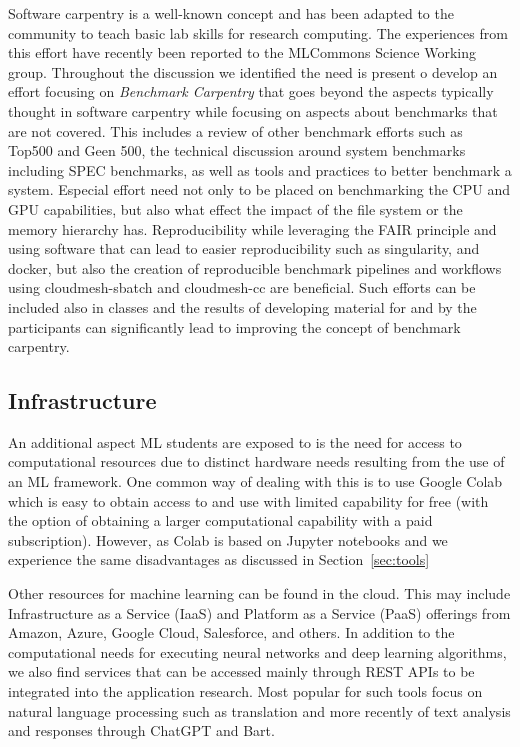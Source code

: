 \documentclass[utf8]{FrontiersinVancouver} %
\begin{document}
{Software carpentry \citep{software-carpentry} is a well-known concept
and has been adapted to the community to teach basic lab skills for
research computing.  The experiences from this effort have recently
been reported to the MLCommons Science Working group. Throughout the
discussion we identified the need is present o develop an effort
focusing on {\em Benchmark Carpentry} that goes beyond the aspects
typically thought in software carpentry while focusing on aspects
about benchmarks that are not covered. This includes a review of other
benchmark efforts such as Top500 and Geen 500, the technical
discussion around system benchmarks including SPEC benchmarks, as well
as tools and practices to better benchmark a system. Especial effort
need not only to be placed on benchmarking the CPU and GPU
capabilities, but also what effect the impact of the file system or
the memory hierarchy has. Reproducibility while leveraging the FAIR
principle and using software that can lead to easier reproducibility
such as singularity, and docker, but also the creation of reproducible
benchmark pipelines and workflows using cloudmesh-sbatch and
cloudmesh-cc are beneficial. Such efforts can be included also in
classes and the results of developing material for and by the
participants can significantly lead to improving the concept of
benchmark carpentry.

\subsection{Infrastructure}

An additional aspect ML students are exposed to is the need for access
to computational resources due to distinct hardware needs resulting
from the use of an ML framework. One common way of dealing with this
is to use Google Colab which is easy to obtain access to and use with
limited capability for free (with the option of obtaining a larger
computational capability with a paid subscription).  However, as Colab
is based on Jupyter notebooks and we experience the same disadvantages
as discussed in Section~\ref{sec:tools}

Other resources for machine learning can be found in the cloud. This
may include Infrastructure as a Service (IaaS) and Platform as a
Service (PaaS) offerings from Amazon, Azure, Google Cloud, Salesforce,
and others.  In addition to the computational needs for executing
neural networks and deep learning algorithms, we also find services
that can be accessed mainly through REST APIs to be integrated into
the application research. Most popular for such tools focus on natural
language processing such as translation and more recently of text
analysis and responses through ChatGPT and Bart.

}
\end{document}
